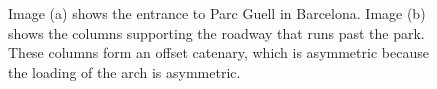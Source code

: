 \documentclass{thesis}
\begin{document}
\begin{figure}
\centering
{}
\caption[Parc Guell, Barcelona, Spain]{Image (a) shows the entrance to Parc Guell in Barcelona. \cite{img:parc_guell}  Image (b) shows the
columns supporting the roadway that runs past the park.  These columns form an offset catenary, which is asymmetric because the loading of
the arch is asymmetric. \cite{img:parc_guell_arch}}
\label{fig:parc_guell}
\end{figure}
\end{document}
